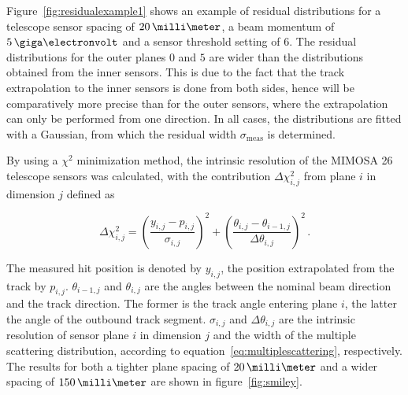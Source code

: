 Figure~\ref{fig:residualexample1} shows an example of residual distributions for a telescope sensor spacing of $20\,\milli\meter$,
 a beam momentum of $5\,\giga\electronvolt$ and a sensor threshold setting of $6$.
The residual distributions for the outer planes $0$ and $5$ are wider than the distributions obtained from the inner sensors.
This is due to the fact that the track extrapolation to the inner sensors is done from both sides, hence will be comparatively more precise than for the outer sensors,
 where the extrapolation can only be performed from one direction. 
In all cases, the distributions are fitted with a Gaussian, from which the residual width $\sigma_{\textrm{meas}}$ is determined.



% 

By using a $\chi^{2}$ minimization method, the intrinsic resolution of the {MIMOSA 26} telescope sensors was calculated, with the contribution $\Delta \chi^2_{i,j}$ from plane $i$ in dimension $j$ defined as

\begin{equation}
\Delta \chi^2_{i,j} = \left( \frac{y_{i,j} - p_{i,j}}{\sigma_{i,j}} \right)^2 +
\left( \frac{\theta_{i,j} - \theta_{i-1,j}}{\Delta \theta_{i,j}} \right)^2 \,.
\end{equation}

\noindent The measured hit position is denoted by $y_{i,j}$, the position extrapolated from the track by $p_{i,j}$. $\theta_{i-1,j}$ and $\theta_{i,j}$ are the angles between the nominal beam direction
 and the track direction. The former is the track angle entering plane $i$, the latter the angle of the outbound track segment.
$\sigma_{i,j}$ and $\Delta \theta_{i,j}$ are the intrinsic resolution of sensor plane $i$ in dimension $j$ and the width of the multiple scattering distribution,
 according to equation~\ref{eq:multiplescattering}, respectively.
The results for both a tighter plane spacing of $20\,\milli\meter$ and a wider spacing of $150\,\milli\meter$ are shown in figure~\ref{fig:smiley}.\\

